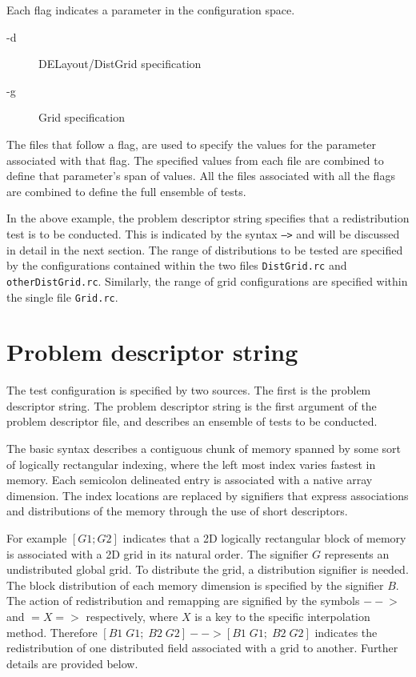 \documentclass{article}
\begin{document}
Each flag indicates a parameter in the configuration space. 
\begin{description}
       \item [-d] DELayout/DistGrid specification
       \item [-g] Grid specification
\end{description}
The files that follow a flag, are used to specify the values for the parameter associated with that flag. The specified values from each file are combined to define that parameter's span of values.  All the files associated with all the flags are combined to define the full ensemble of tests.
 
In the above example, the problem descriptor string specifies that a redistribution test is to be conducted. This is indicated by the syntax  \texttt{-->} and will be discussed in detail in the next section. The range of distributions to be tested are specified by the configurations contained within the two files \texttt{DistGrid.rc} and  \texttt{otherDistGrid.rc}. Similarly, the range of grid configurations are specified within the single file \texttt{Grid.rc}.

\section{Problem descriptor string}
The test configuration is specified by two sources. The first is the problem descriptor string. The problem descriptor string is the first argument of the problem descriptor file, and describes an ensemble of tests to be conducted. 

The basic syntax describes a contiguous chunk of memory spanned by some sort of logically rectangular indexing, where the left most index varies fastest in memory. Each semicolon delineated entry is associated with a native array dimension. The index locations are replaced by signifiers that express associations and distributions of the memory through the use of short descriptors. 

For example $[ G1; G2 ]$ indicates that a 2D logically rectangular block of memory is associated with a 2D grid in its natural order. The signifier $G$ represents an undistributed global grid. To distribute the grid, a distribution signifier is needed. The block distribution of each memory dimension is specified by the signifier $B$. The action of redistribution and remapping are signified by the symbols $-- \!\!\! >$ and $=X=>$ respectively, where $X$ is a key to the specific interpolation method. Therefore $[B1 \; G1; \; B2 \; G2 ] --> [B1\; G1; \; B2  \; G2 ]$ indicates the redistribution of one distributed field associated with a grid to another. Further details are provided below.
\end{document}
